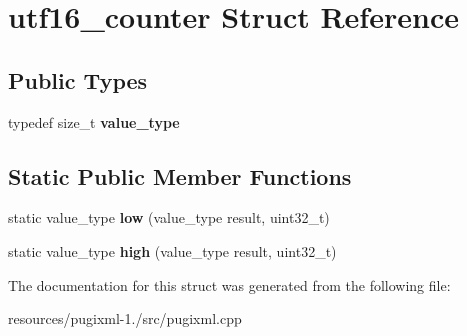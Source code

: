 \hypertarget{structutf16__counter}{\section{utf16\+\_\+counter Struct Reference}
\label{structutf16__counter}
}
\subsection*{Public Types}
\begin{DoxyCompactItemize}
\item 
\hypertarget{structutf16__counter_a0d63f9ca809d182b2f184ef93bd11107}{typedef size\+\_\+t {\bfseries value\+\_\+type}}\label{structutf16__counter_a0d63f9ca809d182b2f184ef93bd11107}

\end{DoxyCompactItemize}
\subsection*{Static Public Member Functions}
\begin{DoxyCompactItemize}
\item 
\hypertarget{structutf16__counter_a4571f3d0fbf0ce763904ec3321dcb41e}{static value\+\_\+type {\bfseries low} (value\+\_\+type result, uint32\+\_\+t)}\label{structutf16__counter_a4571f3d0fbf0ce763904ec3321dcb41e}

\item 
\hypertarget{structutf16__counter_ac1a8793996e57dc28fd22f3165628e4d}{static value\+\_\+type {\bfseries high} (value\+\_\+type result, uint32\+\_\+t)}\label{structutf16__counter_ac1a8793996e57dc28fd22f3165628e4d}

\end{DoxyCompactItemize}


The documentation for this struct was generated from the following file\+:\begin{DoxyCompactItemize}
\item 
resources/pugixml-\/1./src/pugixml.\+cpp\end{DoxyCompactItemize}
